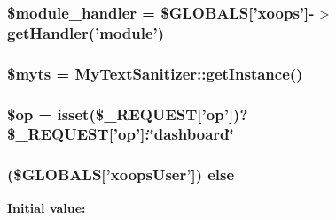 \hypertarget{admin_2index_8php_afe9169534dbc3935c0823c21cfbf68bb}{
\subsubsection[{\$module\-\_\-handler}]{\setlength{\rightskip}{0pt plus 5cm}\$module\-\_\-handler = \$G\-L\-O\-B\-A\-L\-S\mbox{[}'xoops'\mbox{]}-\/$>$get\-Handler('module')}}\label{admin_2index_8php_afe9169534dbc3935c0823c21cfbf68bb}
\hypertarget{admin_2index_8php_a12466d9a3f1c87076ded6bfe0cf0c9e5}{
\subsubsection[{\$myts}]{\setlength{\rightskip}{0pt plus 5cm}\$myts = My\-Text\-Sanitizer\-::get\-Instance()}}\label{admin_2index_8php_a12466d9a3f1c87076ded6bfe0cf0c9e5}
\hypertarget{admin_2index_8php_a7c93a81c9b28ec2f78f33cdabda28c76}{
\subsubsection[{\$op}]{\setlength{\rightskip}{0pt plus 5cm}\$op = isset(\$\-\_\-\-R\-E\-Q\-U\-E\-S\-T\mbox{[}'op'\mbox{]})?\$\-\_\-\-R\-E\-Q\-U\-E\-S\-T\mbox{[}'op'\mbox{]}\-:\char`\"{}dashboard\char`\"{}}}\label{admin_2index_8php_a7c93a81c9b28ec2f78f33cdabda28c76}
\hypertarget{admin_2index_8php_abeec3bb8da31e2d7ea01403e08a70401}{
\subsubsection[{else}]{ (\$G\-L\-O\-B\-A\-L\-S\mbox{[}'xoops\-User'\mbox{]}) else}}\label{admin_2index_8php_abeec3bb8da31e2d7ea01403e08a70401}
{\bfseries Initial value\-:}
